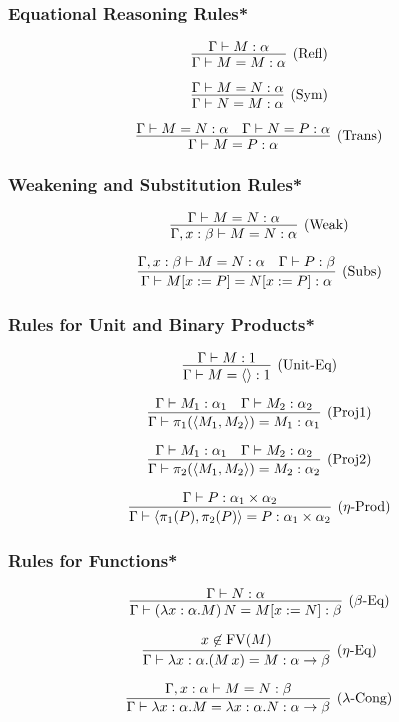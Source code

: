 \documentclass[aspectratio=169]{beamer}
\begin{document}
\begin{frame}
\frametitle{Equational Reasoning Rules*}

\[
\infer[\text{(Refl)}]{\Gamma \vdash M = M : \alpha}{\Gamma \vdash M : \alpha}
\]

\[
\infer[\text{(Sym)}]{\Gamma \vdash N = M : \alpha}{\Gamma \vdash M = N : \alpha}
\]

\[
\infer[\text{(Trans)}]{\Gamma \vdash M = P : \alpha}{\Gamma \vdash M = N : \alpha & \Gamma \vdash N = P : \alpha}
\]
\end{frame}

\begin{frame}
\frametitle{Weakening and Substitution Rules*}

\[
\infer[\text{(Weak)}]{\Gamma, x : \beta \vdash M = N : \alpha}{\Gamma \vdash M = N : \alpha}
\]

\[
\infer[\text{(Subs)}]{\Gamma \vdash M[x := P] = N[x := P] : \alpha}{\Gamma, x : \beta \vdash M = N : \alpha & \Gamma \vdash P : \beta}
\]
\end{frame}

\begin{frame}
\frametitle{Rules for Unit and Binary Products*}

\[
\infer[\text{(Unit-Eq)}]{\Gamma \vdash M = \langle\rangle : 1}{\Gamma \vdash M : 1}
\]

\[
\infer[\text{(Proj1)}]{\Gamma \vdash \pi_1(\langle M_1, M_2 \rangle) = M_1 : \alpha_1}{\Gamma \vdash M_1 : \alpha_1 & \Gamma \vdash M_2 : \alpha_2}
\]

\[
\infer[\text{(Proj2)}]{\Gamma \vdash \pi_2(\langle M_1, M_2 \rangle) = M_2 : \alpha_2}{\Gamma \vdash M_1 : \alpha_1 & \Gamma \vdash M_2 : \alpha_2}
\]

\[
\infer[\text{($\eta$-Prod)}]{\Gamma \vdash \langle \pi_1(P), \pi_2(P) \rangle = P : \alpha_1 \times \alpha_2}{\Gamma \vdash P : \alpha_1 \times \alpha_2}
\]
\end{frame}

\begin{frame}
\frametitle{Rules for Functions*}

\[
\infer[\text{($\beta$-Eq)}]{\Gamma \vdash (\lambda x : \alpha. M) \, N = M[x := N] : \beta}{\Gamma \vdash N : \alpha}
\]

\[
\infer[\text{($\eta$-Eq)}]{\Gamma \vdash \lambda x : \alpha. (M \, x) = M : \alpha \rightarrow \beta}{x \not\in \text{FV}(M)}
\]

\[
\infer[\text{($\lambda$-Cong)}]{\Gamma \vdash \lambda x : \alpha. M = \lambda x : \alpha. N : \alpha \rightarrow \beta}{\Gamma, x : \alpha \vdash M = N : \beta}
\]

\end{frame}
\end{document}
